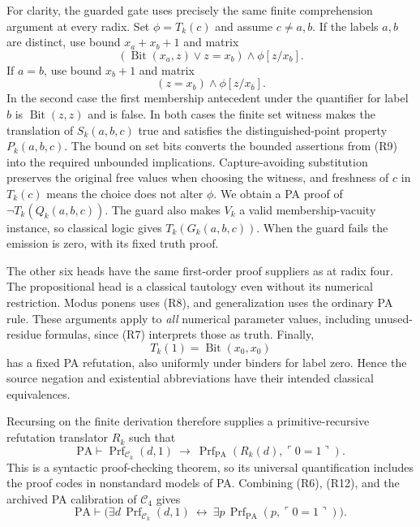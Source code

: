 For clarity, the guarded gate uses precisely the same finite
comprehension argument at every radix. Set $\phi=T_k(c)$ and assume
$c\ne a,b$. If the labels $a,b$ are distinct, use bound
$x_a+x_b+1$ and matrix
\[
  (\operatorname{Bit}(x_a,z)\vee z=x_b)\wedge\phi[z/x_b].
                                                               \tag{R10}
\]
If $a=b$, use bound $x_b+1$ and matrix
\[
  (z=x_b)\wedge\phi[z/x_b].                              \tag{R11}
\]
In the second case the first membership antecedent under the
quantifier for label $b$ is $\operatorname{Bit}(z,z)$ and is false.
In both cases the finite set witness makes the translation of
$S_k(a,b,c)$ true and satisfies the distinguished-point property
$P_k(a,b,c)$. The bound on set bits converts the bounded assertions
from (R9) into the required unbounded implications. Capture-avoiding
substitution preserves the original free values when choosing the
witness, and freshness of $c$ in $T_k(c)$ means the choice does not
alter $\phi$. We obtain a PA proof of $\neg T_k(Q_k(a,b,c))$.
The guard also makes $V_k$ a valid membership-vacuity instance, so
classical logic gives $T_k(G_k(a,b,c))$. When the guard fails the
emission is zero, with its fixed truth proof.

The other six heads have the same first-order proof suppliers as at
radix four. The propositional head is a classical tautology even
without its numerical restriction. Modus ponens uses (R8), and
generalization uses the ordinary PA rule. These arguments apply to
\emph{all} numerical parameter values, including unused-residue
formulas, since (R7) interprets those as truth. Finally,
\[
 T_k(1)=\operatorname{Bit}(x_0,x_0)
\]
has a fixed PA refutation, also uniformly under binders for label
zero. Hence the source negation and existential abbreviations have
their intended classical equivalences.

Recursing on the finite derivation therefore supplies a
primitive-recursive refutation translator $R_k$ such that
\[
 \mathrm{PA}\vdash
 \operatorname{Prf}_{\mathcal C_k}(d,1)
 \ \longrightarrow\
 \operatorname{Prf}_{\mathrm{PA}}(R_k(d),\ulcorner0=1\urcorner).
                                                               \tag{R12}
\]
This is a syntactic proof-checking theorem, so its universal
quantification includes the proof codes in nonstandard models of PA.
Combining (R6), (R12), and the archived PA calibration of
$\mathcal C_4$ gives
\[
 \mathrm{PA}\vdash
 \bigl(\exists d\,\operatorname{Prf}_{\mathcal C_k}(d,1)
       \ \leftrightarrow\
       \exists p\,\operatorname{Prf}_{\mathrm{PA}}
                              (p,\ulcorner0=1\urcorner)\bigr).
                                                               \tag{R13}
\]

